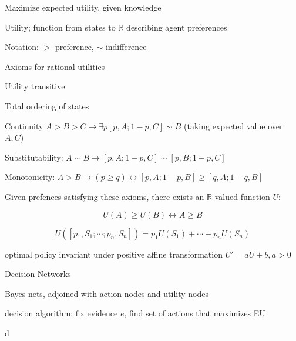 \documentclass[12pt]{article}
\begin{document}
\noindent
Maximize expected utility, given knowledge

Utility; function from states to $\mathds{R}$ describing agent preferences

Notation: $>$ preference, $\sim$ indifference

\noindent
Axioms for rational utilities

Utility transitive

Total ordering of states

Continuity $A>B>C \to \exists p [p, A; 1-p, C] \sim B$ (taking expected value over $A, C$)

Substitutability: $A \sim B \to [p, A; 1-p, C] \sim [p, B; 1-p, C]$

Monotonicity: $A>B \to (p \geq q) \leftrightarrow [p, A; 1-p, B] \geq [q, A; 1-q, B]$

\noindent

Given prefences satisfying these axioms, there exists an $\mathds{R}$-valued function $U$:

$$U(A) \geq U(B) \leftrightarrow A \geq B$$

$$U([p_1, S_1; \cdots ; p_n, S_n]) = p_1U(S_1) + \cdots + p_nU(S_n)$$

optimal policy invariant under positive affine transformation $U' = aU + b, a>0$

\noindent
Decision Networks

Bayes nets, adjoined with action nodes and utility nodes

decision algorithm: fix evidence $e$, find set of actions that maximizes EU


d
\end{document}
